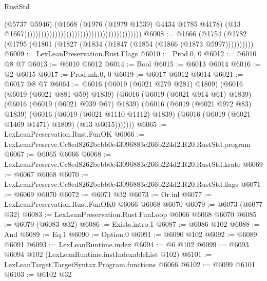 \begin{lexlean}{RustStd}
\begin{coremodule}
                                                                                    (@5737 @5946)
                                                                                    (@1668
                                                                                      (@1976
                                                                                        (@1979
                                                                                          @1539)
                                                                                        @4434
                                                                                        @1785
                                                                                        @4178)
                                                                                      (@13
                                                                                        @1667))))))))))))))))))))))))))))))))))))))))))
@6008 := @1666 (@1754 (@1782 (@1795 (@1801 (@1827 (@1834 (@1847 (@1854 (@1866 (@1873 @5997))))))))))
@6009 := LexLeanPreservation.Rust.Flags
@6010 := Prod.{0, 0}
@6012 := @6010 @8 @7
@6013 := @6010 @6012
@6014 := Bool
@6015 := @6013 @6014
@6016 := @2 @6015
@6017 := Prod.mk.{0, 0}
@6019 := @6017 @6012 @6014
@6021 := @6017 @8 @7
@6064 := @6016
    (@6019 (@6021 @279 @281) @1809)
    (@6016
      (@6019 (@6021 @881 @59) @1839)
      (@6016
        (@6019 (@6021 @914 @61) @1839)
        (@6016
          (@6019 (@6021 @939 @67) @1839)
          (@6016
            (@6019 (@6021 @972 @83) @1839)
            (@6016
              (@6019 (@6021 @1110 @1112) @1839)
              (@6016 (@6019 (@6021 @1469 @1471) @1809) (@13 @6015)))))))
@6065 := LexLeanPreservation.Rust.FunOK
@6066 := LexLeanPreserve.Cc8ed8262bcbb0e43096883c266b224d2.R20.RustStd.program
@6067 := @6065 @6066
@6068 := LexLeanPreserve.Cc8ed8262bcbb0e43096883c266b224d2.R20.RustStd.krate
@6069 := @6067 @6068
@6070 := LexLeanPreserve.Cc8ed8262bcbb0e43096883c266b224d2.R20.RustStd.flags
@6071 := @6069 @6070
@6072 := @6071 @32
@6073 := Or.inl
@6077 := LexLeanPreservation.Rust.FunOK0 @6066 @6068 @6070
@6079 := @6073 (@6077 @32)
@6083 := LexLeanPreservation.Rust.FunLoop @6066 @6068 @6070
@6085 := @6079 (@6083 @32)
@6086 := Exists.intro.{1}
@6087 := @6086 @102
@6088 := And
@6089 := Eq.{1}
@6090 := Option.{0}
@6091 := @6090 @102
@6092 := @6089 @6091
@6093 := LexLeanRuntime.index
@6094 := @6 @102
@6099 := @6093 @6094 @102 (LexLeanRuntime.instIndexableList @102)
@6101 := LexLeanTarget.TargetSyntax.Program.functions @6066
@6102 := @6099 @6101
@6103 := @6102 @32

\end{coremodule}
\end{lexlean}
